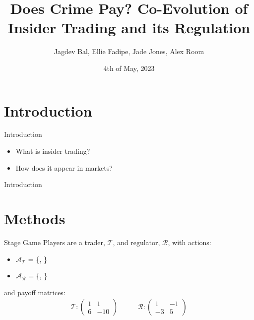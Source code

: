 \documentclass{beamer}
\title{Does Crime Pay? Co-Evolution of Insider Trading and its Regulation}
\author{Jagdev Bal, Ellie Fadipe, Jade Jones, Alex Room}
\date{4th of May, 2023}
\begin{document}
\begin{frame}
\titlepage
\end{frame}


\section{Introduction}
\begin{frame}{Introduction}
\begin{itemize}
    \item What is insider trading?
    \item How does it appear in markets?
\end{itemize}
\end{frame}

\begin{frame}{Introduction}
    
\end{frame}


\section{Methods}
\begin{frame}{Stage Game}
Players are a trader, $\mathcal{T}$, and regulator, $\mathcal{R}$, with actions:
\begin{itemize}
\item $\mathcal{A}_\mathcal{T}$ = \{, \}
\item $\mathcal{A}_\mathcal{R}$ = \{, \}
\end{itemize}

and payoff matrices:
\begin{equation*}
\begin{split}
    \mathcal{T}: 
    \begin{pmatrix}
    1 & 1 \\
    6 & -10
    \end{pmatrix}
\end{split}
\quad\quad
\begin{split}
    \mathcal{R}: 
    \begin{pmatrix}
    1 & -1 \\
    -3 & 5
    \end{pmatrix}
\end{split}
\end{equation*}

\end{frame}
\end{document}
